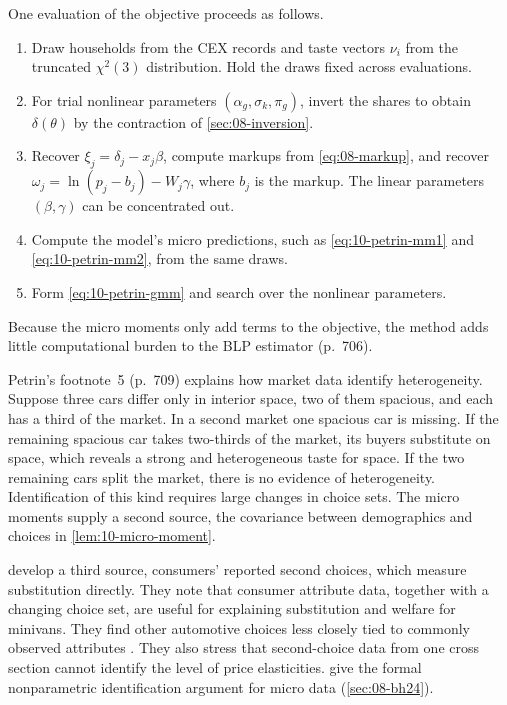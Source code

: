  One evaluation of the objective proceeds as follows.
\begin{enumerate}[label=(\roman*)]
  \item Draw households from the CEX records and taste vectors $\nu_i$ from the truncated $\chi^2(3)$ distribution.
        Hold the draws fixed across evaluations.
  \item For trial nonlinear parameters $(\alpha_g, \sigma_k, \pi_g)$, invert the shares to obtain $\delta(\theta)$ by
        the contraction of \cref{sec:08-inversion}.
  \item Recover $\xi_j = \delta_j - x_j\beta$, compute markups from \eqref{eq:08-markup}, and recover $\omega_j = \ln(p_j -
        b_j) - W_j\gamma$, where $b_j$ is the markup. The linear parameters $(\beta,\gamma)$ can be concentrated out.
  \item Compute the model's micro predictions, such as \eqref{eq:10-petrin-mm1} and \eqref{eq:10-petrin-mm2}, from
        the same draws.
  \item Form \eqref{eq:10-petrin-gmm} and search over the nonlinear parameters.
\end{enumerate}
Because the micro moments only add terms to the objective, the method adds little computational burden to the BLP
estimator (p.~706).

 Petrin's footnote~5 (p.~709) explains how market data identify heterogeneity. Suppose
three cars differ only in interior space, two of them spacious, and each has a third of the market. In a second
market one spacious car is missing. If the remaining spacious car takes two-thirds of the market, its buyers
substitute on space, which reveals a strong and heterogeneous taste for space. If the two remaining cars split the
market, there is no evidence of heterogeneity. Identification of this kind requires large changes in choice sets. The
micro moments supply a second source, the covariance between demographics and choices in
\cref{lem:10-micro-moment}.

\citet{BerryLevinsohnPakes2004} develop a third source, consumers' reported second choices, which measure substitution
directly. They note that consumer attribute data, together with a changing choice set, are useful for explaining
substitution and welfare for minivans. They find other automotive choices less closely tied to commonly observed
attributes \citep[p.~70, n.~1]{BerryLevinsohnPakes2004}. They also stress that second-choice data from one cross
section cannot identify the level of price elasticities. \citet{BerryHaile2024} give the formal nonparametric
identification argument for micro data (\cref{sec:08-bh24}).

